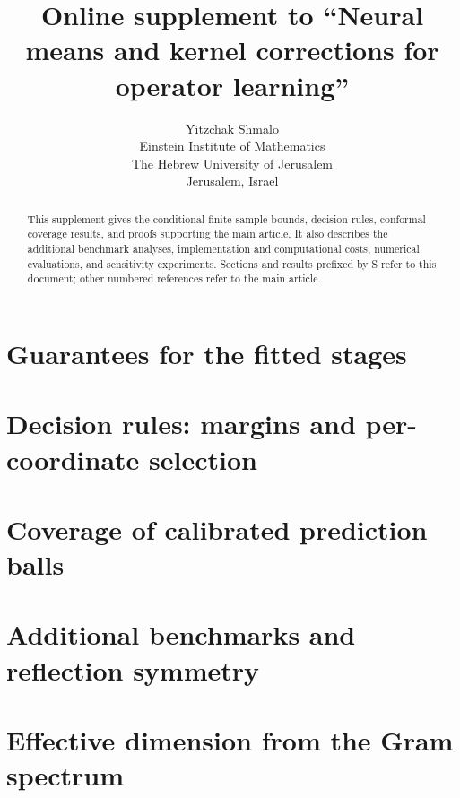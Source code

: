 \documentclass[twoside,11pt]{article}
\numberwithin{theorem}{section}
\numberwithin{equation}{section}
\numberwithin{figure}{section}
\numberwithin{table}{section}
\begin{document}
\title{Online supplement to ``Neural means and kernel corrections for
operator learning''}

\author{\name Yitzchak Shmalo \email  \\
       \addr Einstein Institute of Mathematics\\
       The Hebrew University of Jerusalem\\
       Jerusalem, Israel}

\maketitle

\begin{abstract}%
This supplement gives the conditional finite-sample bounds, decision rules,
conformal coverage results, and proofs supporting the main article. It also
describes the additional benchmark analyses, implementation and computational
costs, numerical evaluations, and sensitivity experiments. Sections and results
prefixed by S refer to this document; other numbered references refer to
the main article.
\end{abstract}

\section{Guarantees for the fitted stages}
\label{supp:stages}


\section{Decision rules: margins and per-coordinate selection}
\label{supp:rules}


\section{Coverage of calibrated prediction balls}
\label{supp:conf}


\section{Additional benchmarks and reflection symmetry}
\label{supp:benchmark}


\section{Effective dimension from the Gram spectrum}
\label{supp:deff}

\end{document}
